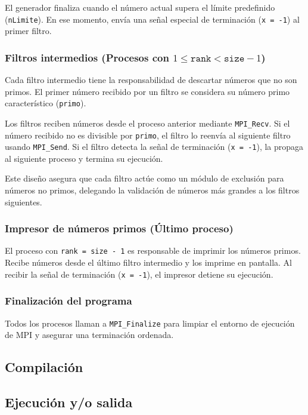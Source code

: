 \documentclass[a4paper,12pt]{article}
\begin{document}
El generador finaliza cuando el número actual supera el límite predefinido (\texttt{nLimite}). En ese momento, envía una señal especial de terminación (\texttt{x = -1}) al primer filtro.

\subsubsection{Filtros intermedios (Procesos con $1 \leq \texttt{rank} < \texttt{size} - 1$)}
Cada filtro intermedio tiene la responsabilidad de descartar números que no son primos. El primer número recibido por un filtro se considera su número primo característico (\texttt{primo}). 

Los filtros reciben números desde el proceso anterior mediante \texttt{MPI\_Recv}. Si el número recibido no es divisible por \texttt{primo}, el filtro lo reenvía al siguiente filtro usando \texttt{MPI\_Send}. Si el filtro detecta la señal de terminación (\texttt{x = -1}), la propaga al siguiente proceso y termina su ejecución.

Este diseño asegura que cada filtro actúe como un módulo de exclusión para números no primos, delegando la validación de números más grandes a los filtros siguientes.

\subsubsection{Impresor de números primos (Último proceso)}
El proceso con \texttt{rank = size - 1} es responsable de imprimir los números primos. Recibe números desde el último filtro intermedio y los imprime en pantalla. Al recibir la señal de terminación (\texttt{x = -1}), el impresor detiene su ejecución.

\subsubsection{Finalización del programa}
Todos los procesos llaman a \texttt{MPI\_Finalize} para limpiar el entorno de ejecución de MPI y asegurar una terminación ordenada.




\subsection{Compilación}



\subsection{Ejecución y/o salida }
\end{document}
